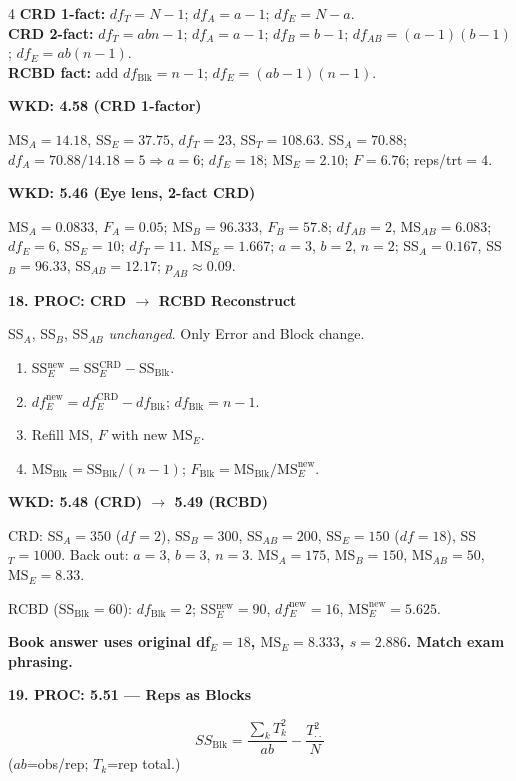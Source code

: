 \documentclass[7pt,letterpaper,landscape]{extarticle}
\newcommand{\secbar}[1]{%
  \vspace{2pt}%
  {\colorbox{black!80}{\parbox{\dimexpr\linewidth-2\fboxsep}{\color{white}\small\bfseries #1}}}\par%
  \vspace{1pt}%
}
\newcommand{\subsec}[1]{\vspace{1pt}\textbf{\small #1}\par}
\newcommand{\MSE}{\mathrm{MS}_E}
\newcommand{\SSB}{\mathrm{SS}_{\text{Blk}}}
\begin{document}
\begin{multicols*}{4}
\textbf{CRD 1-fact:} $df_T{=}N{-}1$; $df_A{=}a{-}1$; $df_E{=}N{-}a$.\\
\textbf{CRD 2-fact:} $df_T{=}abn{-}1$; $df_A{=}a{-}1$; $df_B{=}b{-}1$; $df_{AB}{=}(a{-}1)(b{-}1)$; $df_E{=}ab(n{-}1)$.\\
\textbf{RCBD fact:} add $df_{\text{Blk}}{=}n{-}1$; $df_E{=}(ab{-}1)(n{-}1)$.

\subsec{WKD: 4.58 (CRD 1-factor)}
MS$_A{=}14.18$, SS$_E{=}37.75$, $df_T{=}23$, SS$_T{=}108.63$.
SS$_A{=}70.88$; $df_A{=}70.88/14.18{=}5\Rightarrow a{=}6$; $df_E{=}18$; $\MSE{=}2.10$; $F{=}6.76$; reps/trt$=4$.

\subsec{WKD: 5.46 (Eye lens, 2-fact CRD)}
MS$_A{=}0.0833$, $F_A{=}0.05$; MS$_B{=}96.333$, $F_B{=}57.8$; $df_{AB}{=}2$, MS$_{AB}{=}6.083$; $df_E{=}6$, SS$_E{=}10$; $df_T{=}11$.
$\MSE{=}1.667$; $a{=}3$, $b{=}2$, $n{=}2$; SS$_A{=}0.167$, SS$_B{=}96.33$, SS$_{AB}{=}12.17$; $p_{AB}{\approx}0.09$.

\secbar{18. PROC: CRD $\to$ RCBD Reconstruct}
SS$_A$, SS$_B$, SS$_{AB}$ \emph{unchanged}. Only Error and Block change.
\begin{enumerate}[leftmargin=10pt]
\item SS$_E^{\text{new}}{=}$SS$_E^{\text{CRD}}{-}\SSB$.
\item $df_E^{\text{new}}{=}df_E^{\text{CRD}}{-}df_{\text{Blk}}$; $df_{\text{Blk}}{=}n{-}1$.
\item Refill MS, $F$ with new $\MSE$.
\item MS$_{\text{Blk}}{=}\SSB/(n{-}1)$; $F_{\text{Blk}}{=}$MS$_{\text{Blk}}/\MSE^{\text{new}}$.
\end{enumerate}

\subsec{WKD: 5.48 (CRD) $\to$ 5.49 (RCBD)}
CRD: SS$_A{=}350$ ($df{=}2$), SS$_B{=}300$, SS$_{AB}{=}200$, SS$_E{=}150$ ($df{=}18$), SS$_T{=}1000$. Back out: $a{=}3$, $b{=}3$, $n{=}3$. MS$_A{=}175$, MS$_B{=}150$, MS$_{AB}{=}50$, $\MSE{=}8.33$.

RCBD ($\SSB{=}60$): $df_{\text{Blk}}{=}2$; SS$_E^{\text{new}}{=}90$, $df_E^{\text{new}}{=}16$, $\MSE^{\text{new}}{=}5.625$.

\textbf{Book answer uses original df$_E{=}18$, $\MSE{=}8.333$, $s{=}2.886$. Match exam phrasing.}

\secbar{19. PROC: 5.51 — Reps as Blocks}
\[SS_{\text{Blk}}{=}\dfrac{\sum_k T_k^2}{ab}-\dfrac{T_{\cdot\cdot}^2}{N}\]
($ab$=obs/rep; $T_k$=rep total.)


\end{multicols*}
\end{document}
